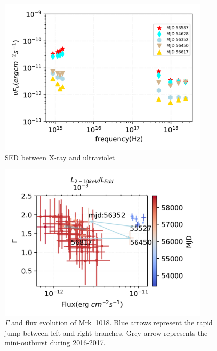 \documentclass[twocolumn]{aastex63}
\begin{document}
\begin{figure}
\centering
	\includegraphics[width=0.9\textwidth]{./pic/Mrk1018_uvot_xray_sed.png}
    \caption{SED between X-ray and ultraviolet}
    \label{fig:xray-uvot-sed}
\end{figure}

\begin{figure}
\centering
	\includegraphics[width=0.9\textwidth]{./pic/xrayappendgood-errorbar-f-g-tmap.png}
    \caption{$\Gamma$ and flux evolution of Mrk~1018. Blue arrows represent the rapid jump between left and right branches. Grey arrow represents the mini-outburst during 2016-2017.}
    \label{fig:xrayappendgood-fandg-tmap}
\end{figure}
\end{document}
